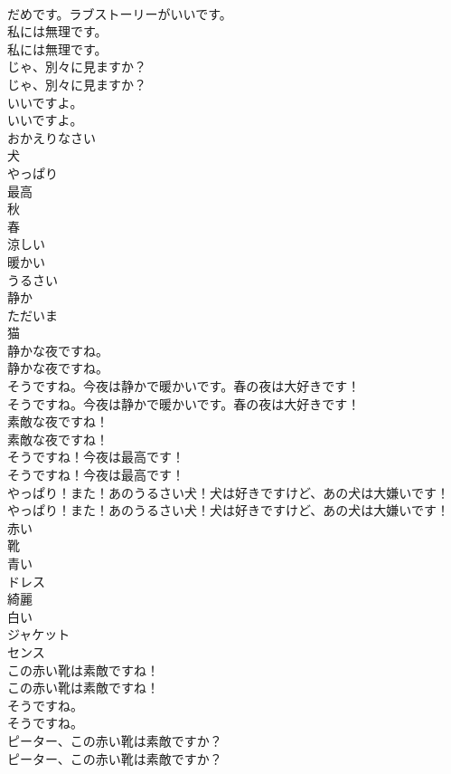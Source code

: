 \documentclass[8pt]{extreport}
\begin{document}
\begin{CJK}{UTF8}{min}
\\	だめです。ラブストーリーがいいです。 
\\	私には無理です。	
\\	私には無理です。 
\\	じゃ、別々に見ますか？	
\\	じゃ、別々に見ますか？ 
\\	いいですよ。	
\\	いいですよ。 
\\	おかえりなさい
\\	犬
\\	やっぱり
\\	最高
\\	秋
\\	春
\\	涼しい
\\	暖かい
\\	うるさい
\\	静か
\\	ただいま
\\	猫
\\	静かな夜ですね。	
\\	静かな夜ですね。 
\\	そうですね。今夜は静かで暖かいです。春の夜は大好きです！	
\\	そうですね。今夜は静かで暖かいです。春の夜は大好きです！ 
\\	素敵な夜ですね！	
\\	素敵な夜ですね！ 
\\	そうですね！今夜は最高です！	
\\	そうですね！今夜は最高です！ 
\\	やっぱり！また！あのうるさい犬！犬は好きですけど、あの犬は大嫌いです！	
\\	やっぱり！また！あのうるさい犬！犬は好きですけど、あの犬は大嫌いです！ 
\\	赤い
\\	靴
\\	青い
\\	ドレス
\\	綺麗
\\	白い
\\	ジャケット
\\	センス
\\	この赤い靴は素敵ですね！	
\\	この赤い靴は素敵ですね！ 
\\	そうですね。	
\\	そうですね。 
\\	ピーター、この赤い靴は素敵ですか？	
\\	ピーター、この赤い靴は素敵ですか？ 

\end{CJK}
\end{document}
